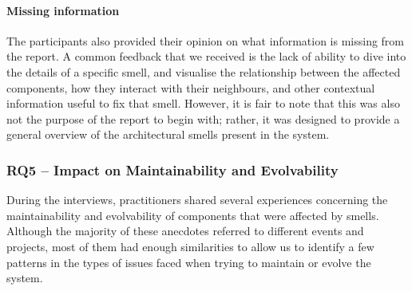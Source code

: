 \paragraph{Missing information}
The participants also provided their opinion on what information is missing from the report.
A common feedback that we received is the lack of ability to dive into the details of a specific smell, and visualise the relationship between the affected components, how they interact with their neighbours, and other contextual information useful to fix that smell.
However, it is fair to note that this was also not the purpose of the report to begin with; rather, it was designed to provide a general overview of the architectural smells present in the system.


\subsubsection{RQ5 -- Impact on Maintainability and Evolvability}\label{c4:sec:results-rq5}
During the interviews, practitioners shared several experiences concerning the maintainability and evolvability of components that were affected by smells.
Although the majority of these anecdotes referred to different events and projects, most of them had enough similarities to allow us to identify a few patterns in the types of issues faced when trying to maintain or evolve the system.


